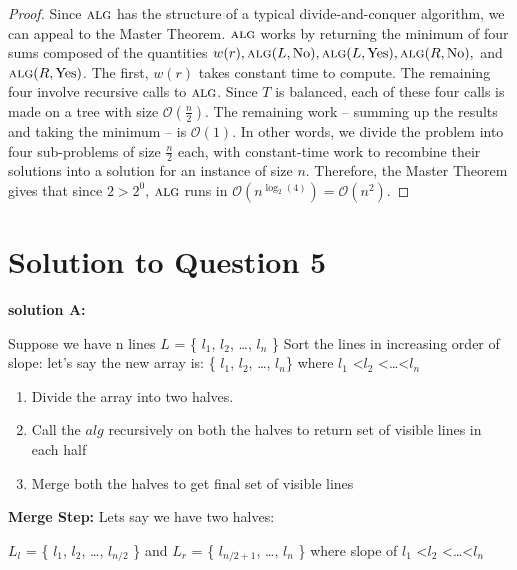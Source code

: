 \documentclass[11pt]{article}
\renewcommand{\O}{\mathcal{O}}
\newcommand{\alg}{\textsc{alg}}
\begin{document}
\begin{proof}
  Since $\alg$ has the structure of a typical divide-and-conquer algorithm, we can appeal to the Master Theorem.
  $\alg$ works by returning the minimum of four sums composed of the quantities $w(r), \alg(L, \operatorname{No}), \alg(L, \operatorname{Yes}), \alg(R, \operatorname{No}),$ and $\alg(R, \operatorname{Yes})$.
  The first, $w(r)$ takes constant time to compute.
  The remaining four involve recursive calls to $\alg$.
  Since $T$ is balanced, each of these four calls is made on a tree with size $\O(\frac{n}{2})$.
  The remaining work -- summing up the results and taking the minimum -- is $\O(1)$.
  In other words, we divide the problem into four sub-problems of size $\frac{n}{2}$ each, with constant-time work to recombine their solutions into a solution for an instance of size $n$.
  Therefore, the Master Theorem gives that since $2 > 2^0$, $\alg$ runs in $\O(n^{\log_{2}(4)}) = \O(n^2)$.
\end{proof}


\section{Solution to Question 5}

{\bf solution A:}

Suppose we have n lines $L$ = \{ $l_1$, $l_2$, \dots, $l_n$ \} \newline
Sort the lines in increasing order of slope: \newline
let's say the new array is: \{ $l_1$, $l_2$, \dots , $l_n$\} where $l_1$ \textless $l_2$ \textless \dots \textless $l_n$ \newline
\begin{enumerate}
\item Divide the array into two halves. \newline
\item Call the $alg$ recursively on both the halves to return set of visible lines in each half \newline
\item Merge both the halves to get final set of visible lines \newline
\end{enumerate}
{\bf Merge Step:} \newline
Lets say we have two halves: \newline

$L_l$ = \{ $l_1$, $l_2$, \dots, $l_{n/2}$ \}  and $L_r$ = \{ $l_{n/2+1}$, \dots, $l_n$ \}  \newline
where slope of $l_1$ \textless $l_2$ \textless \dots \textless $l_n$
\end{document}
